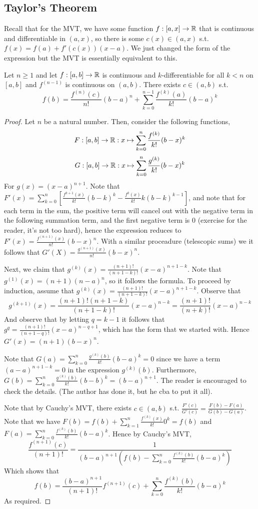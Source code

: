 \subsection{Taylor's Theorem}
Recall that for the MVT, we have some function $f:[a,x]\to\mathbb R$ that is continuous and
differentiable in $(a,x)$, so there is some $c(x)\in(a,x)$ s.t. $f(x)=f(a)+
f'(c(x))(x-a)$. We just changed the form of the expression but the MVT is essentially
equivalent to this.
\begin{theorem}
  Let $n\geq 1$ and let $f:[a,b]\to\mathbb R$ is continuous and $k$-differentiable for all
  $k<n$ on $[a,b]$ and $f^{(n-1)}$ is continuous on $(a,b)$. There exists $c\in(a,b)$ s.t. 
  \[f(b) = \frac{f^{(n)}(c)}{n!}(b-a)^n + \sum_{k=0}^{n-1} \frac{f^{(k)}(a)}{k!}(b-a)^k\]
  \label{thm:taylor}
\end{theorem}
\begin{proof}
  Let $n$ be a natural number. Then, consider the following functions,
  \[F:[a,b]\to\mathbb R:x\mapsto \sum_{k=0}^n \frac{f^{(k)}}{k!} (b-x)^k\]
  \[G:[a,b]\to\mathbb R:x\mapsto \sum_{k=0}^n \frac{g^{(k)}}{k!} (b-x)^k\]
  For $g(x)=(x-a)^{n+1}$. Note that $F'(x)= \sum_{k=0}^n \left[
  \frac{f^{k+1}(x)}{k!}(b-k)^k - \frac{f^{k}(x)}{k!}k(b-k)^{k-1}\right]$, and note that
  for each term in the sum, the positive term will cancel out with the negative term in
  the following summation term, and the first negative term is $0$ (exercise for the
  reader, it's not too hard), hence the expression reduces to
  $F'(x)=\frac{f^{(n+1)}(x)}{n!}(b-x)^n$. With a similar proceadure (telescopic sums) we
  it follows that $G'(X)=\frac{g^{(n+1)}(x)}{n!}(b-x)^n$. 

  Next, we claim that $g^{(k)}(x)=\frac{(n+1)!}{(n+1-k)!}(x-a)^{n+1-k}$. Note that
  $g^{(1)}(x)=(n+1)(n-a)^{n}$, so it follows the formula. To proceed by induction, assume
  that $g^{(k)}(x)=\frac{(n+1)!}{(n+1-k)!}(x-a)^{n+1-k}$. Observe that 
  \[g^{(k+1)}(x)=\frac{(n+1)! (n+1-k)}{(n+1-k)!}(x-a)^{n-k} =
  \frac{(n+1)!}{(n+k)!}(x-a)^{n-k}\]
  And observe that by letting $q=k-1$ it follows that
  $g^{q}=\frac{(n+1)!}{(n+1-q)!}(x-a)^{n-q+1}$, which has the form that we started with. 
  Hence $G'(x)= (n+1) (b-x)^n$. 

  Note that $G(a)= \sum_{k=0}^n \frac{g^{(k)}(b)}{k!} (b-a)^k = 0$ since we have a term
  $(a-a)^{n+1-k}=0$ in the expression $g^{(k)}(b)$. Furthermore, $G(b)= \sum_{k=0}^n
  \frac{g^{(k)}(b)}{k!}(b-b)^{k}= (b-a)^{n+1}$. The reader is encouraged to check the
  details. (The author has done it, but he cba to put it all). 

  Note that by Cauchy's MVT, there exists $c\in(a,b)$ s.t. $\frac{F'(c)}{G'(c)}=
  \frac{F(b)-F(a)}{G(b)-G(a)}$. Note that we have $F(b)= f(b)+ \sum_{k=1}^{n}
  \frac{f^{(k)}(x)}{k!}0^k = f(b)$ and $F(a)=\sum_{k=0}^{n}\frac{f^{(k)}(b)}{k!}(b-a)^k$.
  Hence by Cauchy's MVT, 
  \[\frac{f^{(n+1)}(c)}{(n+1)!} = \frac{1}{(b-a)^{n+1} \left( f(b)-\sum_{k=0}^n
  \frac{f^{(k)}(b)}{k!}(b-a)^k \right)}\]
  Which shows that 
  \[f(b) = \frac{(b-a)^{n+1}}{(n+1)!}f^{(n+1)}(c) + \sum_{k=0}^n
  \frac{f^{(k)}(b)}{k!}(b-a)^k\]
  As required.
\end{proof}

